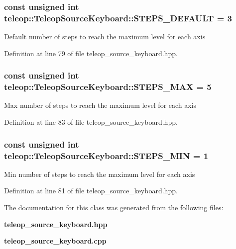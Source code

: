 \subsubsection[{STEPS\_\-DEFAULT}]{\setlength{\rightskip}{0pt plus 5cm}const unsigned int {\bf teleop::TeleopSourceKeyboard::STEPS\_\-DEFAULT} = 3\hspace{0.3cm}{\ttfamily  [static]}}\label{classteleop_1_1TeleopSourceKeyboard_a798dfd6b95ffa7394f4b610e08355fb7}
Default number of steps to reach the maximum level for each axis 

Definition at line 79 of file teleop\_\-source\_\-keyboard.hpp.

\subsubsection[{STEPS\_\-MAX}]{\setlength{\rightskip}{0pt plus 5cm}const unsigned int {\bf teleop::TeleopSourceKeyboard::STEPS\_\-MAX} = 5\hspace{0.3cm}{\ttfamily  [static]}}\label{classteleop_1_1TeleopSourceKeyboard_a82e7603533531b605f3e148d1de7366e}
Max number of steps to reach the maximum level for each axis 

Definition at line 83 of file teleop\_\-source\_\-keyboard.hpp.

\subsubsection[{STEPS\_\-MIN}]{\setlength{\rightskip}{0pt plus 5cm}const unsigned int {\bf teleop::TeleopSourceKeyboard::STEPS\_\-MIN} = 1\hspace{0.3cm}{\ttfamily  [static]}}\label{classteleop_1_1TeleopSourceKeyboard_a13a423ce5ce0d7358f9c6b5d0d820dde}
Min number of steps to reach the maximum level for each axis 

Definition at line 81 of file teleop\_\-source\_\-keyboard.hpp.



The documentation for this class was generated from the following files:\begin{DoxyCompactItemize}
\item 
{\bf teleop\_\-source\_\-keyboard.hpp}\item 
{\bf teleop\_\-source\_\-keyboard.cpp}\end{DoxyCompactItemize}
